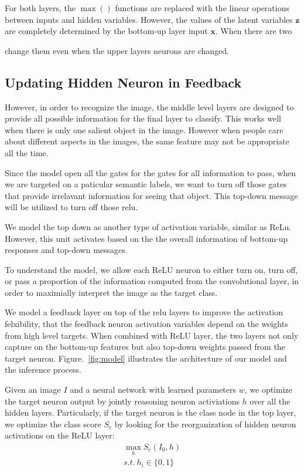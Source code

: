 For both layers, the $\max()$ functions are replaced with the linear operations between inputs and hidden variables. However, the values of the latent variables $\mathbf{z}$ are completely determined by the bottom-up layer input $\mathbf{x}$. When there are two  

change them even when the upper layers neurons are changed.



\subsection{Updating Hidden Neuron in Feedback}
However, in order to recognize the image, the middle level layers are designed to provide all possible information for the final layer to classify. This works well when there is only one salient object in the image. However when people care about different aspects in the images, the same feature may not be appropriate all the time. 

Since the model open all the gates for the gates for all information to pass, when we are targeted on a paticular semantic labels, we want to turn off those gates that provide irrelavant information for seeing that object. This top-down message will be utilized to turn off those relu.

We model the top down as another type of activation variable, similar as ReLu. However, this unit activates based on the the overall information of bottom-up responses and top-down messages. 

To understand the model, we allow each ReLU neuron to either turn on, turn off, or pass a proportion of the information computed from the convolutional layer, in order to maximially interpret the image as the target class.

We model a feedback layer on top of the relu layers to improve the activation felxibility, that the feedback neuron activation variables depend on the weights from high level targets. When combined with ReLU layer, the two layers not only capture on the bottom-up features but also top-down weights passed from the target neuron. Figure.~\ref{fig:model} illustrates the architecture of our model and the inference process. 
 
Given an image $I$ and a neural network with learned parameters $w$, we optimize the target neuron output by jointly reasoning neuron activiations $h$ over all the hidden layers. Particularly, if the target neuron is the class node in the top layer, we optimize the class score $S_c$ by looking for the reorganization of hidden neuron activations on the ReLU layer:
\begin{equation}
\begin{aligned}
  \max_h S_c(I_0, h) \\
  s.t.\ h_i \in \{0, 1\}
\end{aligned}
\end{equation}

